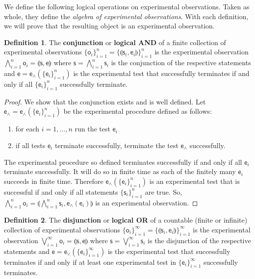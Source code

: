 \documentclass[review]{elsarticle}
\theoremstyle{plain}%
\theoremstyle{definition}
\newtheorem{defn}{Definition}[section]
\theoremstyle{remark}
\begin{document}
We define the following logical operations on experimental observations. Taken as whole, they define the \emph{algebra of experimental observations}. With each definition, we will prove that the resulting object is an experimental observation. 




\begin{defn}
	The \textbf{conjunction} or \textbf{logical AND} of a finite collection  of experimental observations $\{\mathsf{o}_i\}_{i=1}^{n}=\{\llparenthesis \mathsf{s}_i, \mathsf{e}_i\rrparenthesis\}_{i=1}^{n}$ is the experimental observation $\bigwedge\limits_{i=1}^{n} \mathsf{o}_i = \llparenthesis \mathsf{s}, \mathsf{e}\rrparenthesis$ where $\mathsf{s} = \bigwedge\limits_{i=1}^{n} \mathsf{s}_i$ is the conjunction of the respective statements and $\mathsf{e} = \mathsf{e}_\wedge(\{\mathsf{e}_i\}_{i=1}^{n})$ is the experimental test that successfully terminates if and only if all $\{\mathsf{e}_i\}_{i=1}^{n}$ successfully terminate.
\end{defn}

\begin{proof}
	We show that the conjunction exists and is well defined. Let $\mathsf{e}_\wedge=\mathsf{e}_\wedge(\{\mathsf{e}_i\}_{i=1}^{n})$ be the experimental procedure defined as follows:
	\begin{enumerate}
	\item for each $i=1,\ldots,n$ run the test $\mathsf{e}_i$
	\item if all tests $\mathsf{e}_i$ terminate successfully, terminate the test $\mathsf{e}_\wedge$ successfully.
	\end{enumerate}
	The experimental procedure so defined terminates successfully if and only if all $\mathsf{e}_i$ terminate successfully. It will do so in finite time as each of the finitely many $\mathsf{e}_i$ succeeds in finite time. Therefore $\mathsf{e}_\wedge(\{\mathsf{e}_i\}_{i=1}^{n})$ is an experimental test that is successful if and only if all statements $\{\mathsf{s}_i\}_{i=1}^{n}$ are true. So, $\bigwedge\limits_{i=1}^{n} \mathsf{o}_i = \llparenthesis\bigwedge\limits_{i=1}^{n} \mathsf{s}_i, \mathsf{e}_{\wedge}(\mathsf{e}_i)\rrparenthesis$ is an experimental observation.
\end{proof}

\begin{defn}
	The \textbf{disjunction} or \textbf{logical OR} of a countable (finite or infinite) collection of experimental observations $\{\mathsf{o}_i\}_{i=1}^{\infty}=\{\llparenthesis \mathsf{s}_i, \mathsf{e}_i\rrparenthesis\}_{i=1}^{\infty}$ is the experimental observation $\bigvee\limits_{i=1}^{\infty} \mathsf{o}_i = \llparenthesis \mathsf{s}, \mathsf{e}\rrparenthesis$ where $\mathsf{s} = \bigvee\limits_{i=1}^{\infty} \mathsf{s}_i$ is the disjunction of the respective statements and $\mathsf{e} = \mathsf{e}_\vee(\{\mathsf{e}_i\}_{i=1}^{\infty})$ is the experimental test that successfully terminates if and only if at least one experimental test in $\{\mathsf{e}_i\}_{i=1}^{\infty}$ successfully terminates.
\end{defn}
\end{document}
